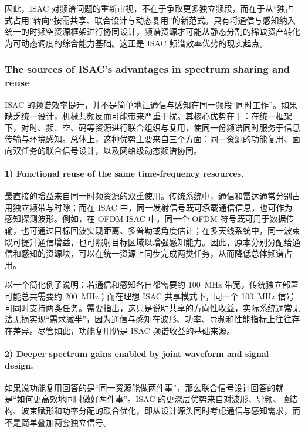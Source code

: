 因此，ISAC 对频谱问题的重新审视，不在于争取更多独立频段，而在于从“独占式占用”转向“按需共享、联合设计与动态复用”的新范式\cite{Liu2020JointRadarComm,Liu2022ISAC,Gonzalez2024integrated}。只有将通信与感知纳入统一的时频空资源框架进行协同设计，频谱资源才可能从静态分割的稀缺资产转化为可动态调度的综合能力基础。这正是 ISAC 频谱效率优势的现实起点。

\subsubsection{The sources of ISAC's advantages in spectrum sharing and reuse}
\label{subsubsec:ch1-adv source of isac-spectrum}

ISAC 的频谱效率提升，并不是简单地让通信与感知在同一频段“同时工作”。如果缺乏统一设计，机械共频反而可能带来严重干扰。其核心优势在于：在统一框架下，对时、频、空、码等资源进行联合组织与复用，使同一份频谱同时服务于信息传输与环境感知。总体上，这种优势主要来自三个方面：同一资源的功能复用、面向双任务的联合信号设计，以及网络级动态频谱协同。

\paragraph{1) Functional reuse of the same time-frequency resources.}
最直接的增益来自同一时频资源的双重使用。传统系统中，通信和雷达通常分别占用独立频带与时隙；而在 ISAC 中，同一发射信号既可承载通信信息，也可作为感知探测波形\cite{Liu2022ISAC,Hassanien2015dual,Sturm2011WaveformDesign}。例如，在 OFDM-ISAC 中，同一个 OFDM 符号既可用于数据传输，也可通过目标回波实现距离、多普勒或角度估计；在多天线系统中，同一波束既可提升通信增益，也可照射目标区域以增强感知能力\cite{Liu2020JointRadarComm,Gonzalez2024integrated}。因此，原本分别分配给通信和感知的资源块，可以在统一资源上同步完成两类任务，从而降低总体频谱占用。

以一个简化例子说明：若通信和感知各自都需要约 100~MHz 带宽，传统独立部署可能总共需要约 200~MHz；而在理想 ISAC 共享模式下，同一个 100~MHz 信号可同时支持两类任务。需要指出，这只是说明共享的方向性收益，实际系统通常无法无损实现“需求减半”，因为通信与感知在波形、功率、导频和性能指标上往往存在差异\cite{Liu2020JointRadarComm,Liu2022ISAC}。尽管如此，功能复用仍是 ISAC 频谱收益的基础来源。

\paragraph{2) Deeper spectrum gains enabled by joint waveform and signal design.}
如果说功能复用回答的是“同一资源能做两件事”，那么联合信号设计回答的就是“如何更高效地同时做好两件事”。ISAC 的更深层优势来自对波形、导频、帧结构、波束赋形和功率分配的联合优化，即从设计源头同时考虑通信与感知需求，而不是简单叠加两套独立信号。

